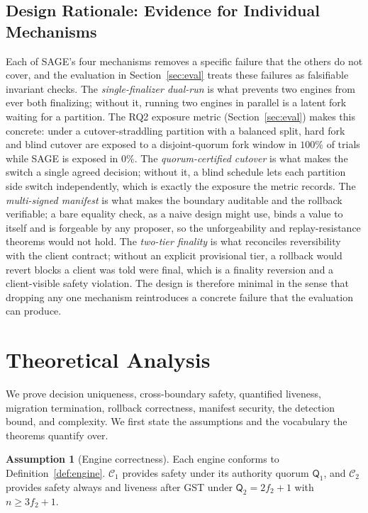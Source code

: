 \documentclass[journal]{IEEEtran}
\theoremstyle{definition}
\newtheorem{assumption}{Assumption}
\theoremstyle{remark}
\begin{document}
\subsection{Design Rationale: Evidence for Individual Mechanisms}
Each of SAGE's four mechanisms removes a specific failure that the others do not cover, and the
evaluation in Section~\ref{sec:eval} treats these failures as falsifiable invariant checks.
The \emph{single-finalizer dual-run} is what prevents two engines from ever both finalizing;
without it, running two engines in parallel is a latent fork waiting for a partition. The RQ2
exposure metric (Section~\ref{sec:eval}) makes this concrete: under a cutover-straddling
partition with a balanced split, hard fork and blind cutover are exposed to a disjoint-quorum
fork window in $100\%$ of trials while SAGE is exposed in $0\%$. The
\emph{quorum-certified cutover} is what makes the switch a single agreed decision; without it, a
blind schedule lets each partition side switch independently, which is exactly the exposure the
metric records. The \emph{multi-signed manifest} is what makes the boundary
auditable and the rollback verifiable; a bare equality check, as a naive design might use, binds
a value to itself and is forgeable by any proposer, so the unforgeability and replay-resistance
theorems would not hold. The \emph{two-tier finality} is what reconciles reversibility with the
client contract; without an explicit provisional tier, a rollback would revert blocks a client
was told were final, which is a finality reversion and a client-visible safety violation. The
design is therefore minimal in the sense that dropping any one mechanism reintroduces a concrete
failure that the evaluation can produce.

\section{Theoretical Analysis}
\label{sec:analysis}

We prove decision uniqueness, cross-boundary safety, quantified liveness, migration
termination, rollback correctness, manifest security, the detection bound, and complexity. We
first state the assumptions and the vocabulary the theorems quantify over.

\begin{assumption}[Engine correctness]
\label{as:engines}
Each engine conforms to Definition~\ref{def:engine}. $\mathcal{C}_1$ provides safety under its
authority quorum $\mathsf{Q}_1$, and $\mathcal{C}_2$ provides safety always and liveness after
GST under $\mathsf{Q}_2=2f_2+1$ with $n\ge 3f_2+1$.
\end{assumption}
\end{document}
